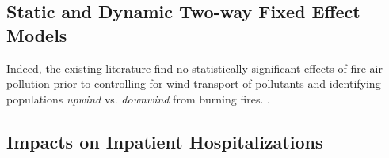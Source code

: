 \documentclass[11pt]{article}
\begin{document}
\begin{spacing}{1.3}


\subsection{Static and Dynamic Two-way Fixed Effect Models}
\label{scn:results_2wayFE}
Indeed, the existing literature find no statistically significant effects of fire air pollution prior to controlling for wind transport of pollutants and identifying populations \textit{upwind} vs. \textit{downwind} from burning fires. \citep{RangelVogl2019,rocha2022winds,he2020straw,zivin2020unintended}.





\subsection{Impacts on Inpatient Hospitalizations}
\label{scn:results_hosp}


\end{spacing}
\end{document}
